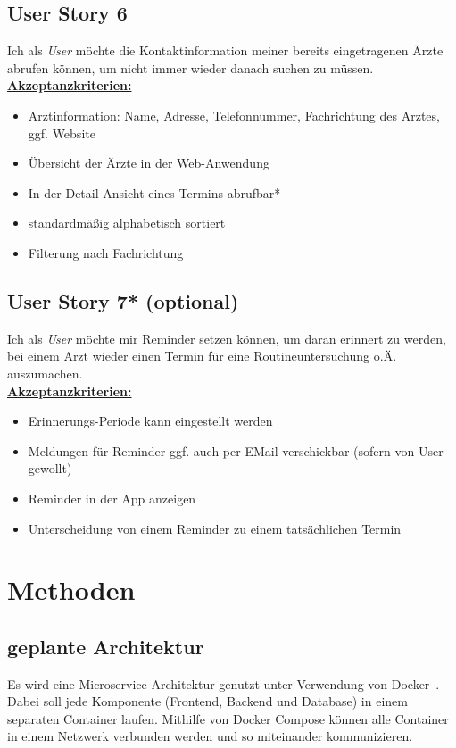 \documentclass[conference]{IEEEtran}
\begin{document}
\subsection{User Story 6}
Ich als \textit{User} möchte die Kontaktinformation meiner bereits eingetragenen Ärzte abrufen können, um nicht immer wieder danach suchen zu müssen.\\
\underline{\textbf{Akzeptanzkriterien:}}
\begin{itemize}
	\item Arztinformation: Name, Adresse, Telefonnummer, Fachrichtung des Arztes, ggf. Website 
	\item Übersicht der Ärzte in der Web-Anwendung
	\item In der Detail-Ansicht eines Termins abrufbar*
	\item standardmäßig alphabetisch sortiert
	\item Filterung nach Fachrichtung
\end{itemize}

\subsection{User Story 7* (optional)}
Ich als \textit{User} möchte mir Reminder setzen können, um daran erinnert zu werden, bei einem Arzt wieder einen Termin für eine Routineuntersuchung o.Ä. auszumachen.\\
\underline{\textbf{Akzeptanzkriterien:}}
\begin{itemize}
	\item Erinnerungs-Periode kann eingestellt werden
	\item Meldungen für Reminder ggf. auch per EMail verschickbar (sofern von User gewollt)
	\item Reminder in der App anzeigen
	\item Unterscheidung von einem Reminder zu einem tatsächlichen Termin
\end{itemize}

\section{Methoden}
\subsection{geplante Architektur}
Es wird eine Microservice-Architektur genutzt unter Verwendung von Docker~\cite{docker}. Dabei soll jede Komponente (Frontend, Backend und Database) in einem separaten Container laufen. Mithilfe von Docker Compose können alle Container in einem Netzwerk verbunden werden und so miteinander kommunizieren.
\end{document}
